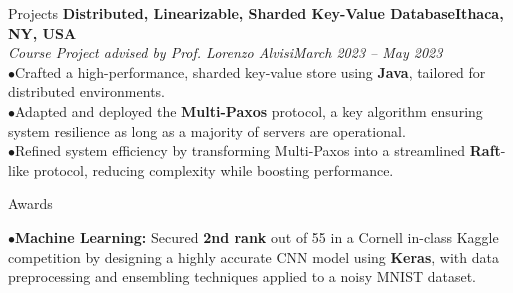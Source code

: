 \documentclass{resume} %
\begin{document}
\begin{rSection}{Projects}
{\bf Distributed, Linearizable, Sharded Key-Value Database}\hfill{\textbf{Ithaca, NY, USA}}
\\{\em Course Project advised by Prof. Lorenzo Alvisi}\hfill {\em March 2023 -- May 2023}
\\ $ \bullet $Crafted a high-performance, sharded key-value store using \textbf{Java}, tailored for distributed environments.
\\ $ \bullet $Adapted and deployed the \textbf{Multi-Paxos} protocol, a key algorithm ensuring system resilience as long as a majority of servers are operational.
\\ $ \bullet $Refined system efficiency by transforming Multi-Paxos into a streamlined \textbf{Raft}-like protocol, reducing complexity while boosting performance.

\end{rSection}



\begin{rSection}{Awards}

$ \bullet $\textbf{Machine Learning:} Secured \textbf{2nd rank} out of 55 in a Cornell in-class Kaggle competition by designing a highly accurate CNN model using \textbf{Keras}, with data preprocessing and ensembling techniques applied to a noisy MNIST dataset.

\end{rSection}

\newpage
\end{document}
